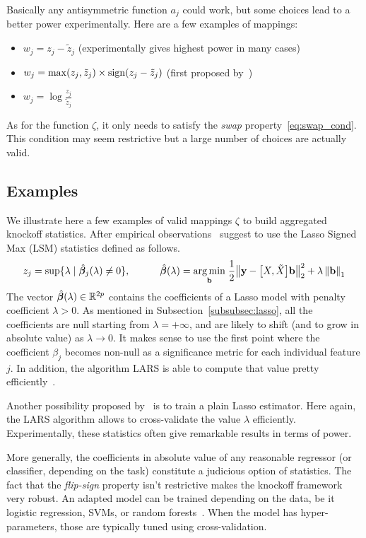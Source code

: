 Basically any antisymmetric function $a_j$ could work, but some choices lead to a better power experimentally.
Here are a few examples of mappings:
\begin{itemize}
    \item $w_j = z_j - \tilde{z}_j$ (experimentally gives highest power in many cases)
    \item $w_j = \max(z_j, \tilde{z}_j) \times \operatorname*{sign}(z_j - \tilde{z}_j)$ (first proposed by~\cite{fixed_x_knockoffs})
    \item $w_j = \log\frac{z_j}{\tilde{z}_j}$
\end{itemize}
As for the function $\zeta$, it only needs to satisfy the \emph{swap} property~\ref{eq:swap_cond}.
This condition may seem restrictive but a large number of choices are actually valid.

\subsection{Examples}\label{subsec:sce}

We illustrate here a few examples of valid mappings $\zeta$
to build aggregated knockoff statistics.
After empirical observations~\cite{fixed_x_knockoffs}
suggest to use the Lasso Signed Max (LSM) statistics defined as follows.
\begin{equation}
    z_j = \sup\{\lambda \mid \hat{\bm{\beta}}_j(\lambda) \neq 0\}
    ,\qquad\quad
    \hat{\bm{\beta}}(\lambda) =
    \underset{\mathbf{b}}{\operatorname*{arg\,min}}\;
    \frac{1}{2}\big\lVert \mathbf{y} - \big[ X, \tilde{X} \big]\mathbf{b} \big\rVert_2^2 + \lambda\left\lVert\mathbf{b}\right\rVert_1
\end{equation}
The vector $\hat{\bm{\beta}}(\lambda) \in \mathbb{R}^{2p}$ contains the coefficients of a Lasso model
with penalty coefficient $\lambda > 0$.
As mentioned in Subsection~\ref{subsubsec:lasso},
all the coefficients are null starting from $\lambda = +\infty$,
and are likely to shift (and to grow in absolute value) as $\lambda \to 0$.
It makes sense to use the first point where the coefficient $\beta_j$ becomes non-null
as a significance metric for each individual feature $j$.
In addition, the algorithm LARS is able to compute that value pretty efficiently~\citep{lars_complexity}.

Another possibility proposed by~\cite{model_x_knockoffs} is to train a plain Lasso estimator.
Here again, the LARS algorithm allows to cross-validate the value $\lambda$ efficiently.
Experimentally, these statistics often give remarkable results in terms of power.

More generally, the coefficients in absolute value of any reasonable regressor
(or classifier, depending on the task) constitute a judicious option of statistics.
The fact that the \emph{flip-sign} property isn't restrictive makes the knockoff framework very robust.
An adapted model can be trained depending on the data, be it logistic regression,
SVMs, or random forests~\cite{random_forests}.
When the model has hyper-parameters, those are typically tuned using cross-validation.

